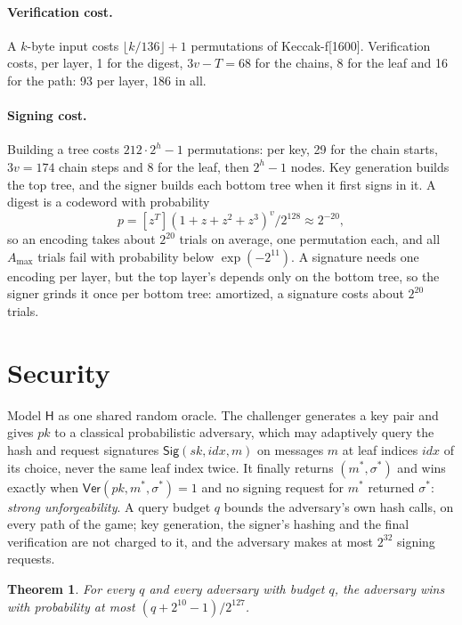 \documentclass[11pt]{article}
\newcommand{\hash}{\mathsf{H}}
\newcommand{\Sig}{\mathsf{Sig}}
\newcommand{\Ver}{\mathsf{Ver}}
\newcommand{\idx}{\mathit{idx}}
\newcommand{\pk}{\mathit{pk}}
\newcommand{\sk}{\mathit{sk}}
\newcommand{\amax}{A_{\max}}
\newtheorem{theorem}{Theorem}
\begin{document}
\paragraph{Verification cost.} A $k$-byte input costs $\lfloor k/136\rfloor+1$ permutations of Keccak-f[1600]. Verification costs, per layer, 1 for the digest, $3v-T=68$ for the chains, 8 for the leaf and 16 for the path: 93 per layer, 186 in all.

\paragraph{Signing cost.} Building a tree costs $212\cdot2^h-1$ permutations: per key, 29 for the chain starts, $3v=174$ chain steps and 8 for the leaf, then $2^h-1$ nodes. Key generation builds the top tree, and the signer builds each bottom tree when it first signs in it. A digest is a codeword with probability
\[
  p=[z^{T}](1+z+z^2+z^3)^{v}/2^{128}\approx2^{-20},
\]
so an encoding takes about $2^{20}$ trials on average, one permutation each, and all $\amax$ trials fail with probability below $\exp(-2^{11})$. A signature needs one encoding per layer, but the top layer's depends only on the bottom tree, so the signer grinds it once per bottom tree: amortized, a signature costs about $2^{20}$ trials.

\section{Security}
\label{sec:security}

Model $\hash$ as one shared random oracle. The challenger generates a key pair and gives $\pk$ to a classical probabilistic adversary, which may adaptively query the hash and request signatures $\Sig(\sk,\idx,m)$ on messages $m$ at leaf indices $\idx$ of its choice, never the same leaf index twice. It finally returns $(m^*,\sigma^*)$ and wins exactly when $\Ver(\pk,m^*,\sigma^*)=1$ and no signing request for $m^*$ returned $\sigma^*$: \emph{strong unforgeability}. A query budget $q$ bounds the adversary's own hash calls, on every path of the game; key generation, the signer's hashing and the final verification are not charged to it, and the adversary makes at most $2^{32}$ signing requests.

\begin{theorem}
For every $q$ and every adversary with budget $q$, the adversary wins with probability at most $(q+2^{10}-1)/2^{127}$.
\end{theorem}
\end{document}

